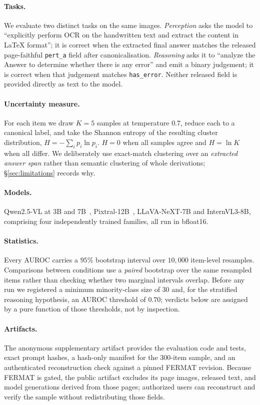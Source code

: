 \documentclass[10pt,twocolumn,letterpaper]{article}
\begin{document}
\paragraph{Tasks.}
We evaluate two distinct tasks on the same images.
\emph{Perception} asks the model to
``explicitly perform OCR on the handwritten text and extract the content
in \LaTeX{} format''; it is correct when the extracted final answer
matches the released page-faithful \texttt{pert\_a} field after
canonicalisation.
\emph{Reasoning} asks it to ``analyze the Answer to determine whether
there is any error'' and emit a binary judgement; it is correct when that
judgement matches \texttt{has\_error}. Neither released field is provided
directly as text to the model.

\paragraph{Uncertainty measure.}
For each item we draw $K=5$ samples at temperature $0.7$, reduce each to
a canonical label, and take the Shannon entropy of the resulting cluster
distribution, $H=-\sum_i p_i \ln p_i$. $H=0$ when all samples agree and
$H=\ln K$ when all differ. We deliberately use exact-match clustering
over an \emph{extracted answer span} rather than semantic clustering of
whole derivations; \S\ref{sec:limitations} records why.

\paragraph{Models.}
Qwen2.5-VL at 3B and 7B~\cite{qwen25vl}, Pixtral-12B~\cite{pixtral},
LLaVA-NeXT-7B and InternVL3-8B, comprising four independently trained
families, all run in bfloat16.

\paragraph{Statistics.}
Every AUROC carries a $95\%$ bootstrap interval over $10{,}000$
item-level resamples. Comparisons between conditions use a \emph{paired}
bootstrap over the same resampled items rather than checking whether two
marginal intervals overlap. Before any run we registered a minimum
minority-class size of $30$ and, for the stratified reasoning hypothesis,
an AUROC threshold of $0.70$; verdicts below are assigned by a pure
function of those thresholds, not by inspection.

\paragraph{Artifacts.}
The anonymous supplementary artifact provides the evaluation code and tests,
exact prompt hashes, a hash-only manifest for the $300$-item sample, and an
authenticated reconstruction check against a pinned FERMAT revision. Because
FERMAT is gated, the public artifact excludes its page images, released text,
and model generations derived from those pages; authorized users can
reconstruct and verify the sample without redistributing those fields.
\end{document}
